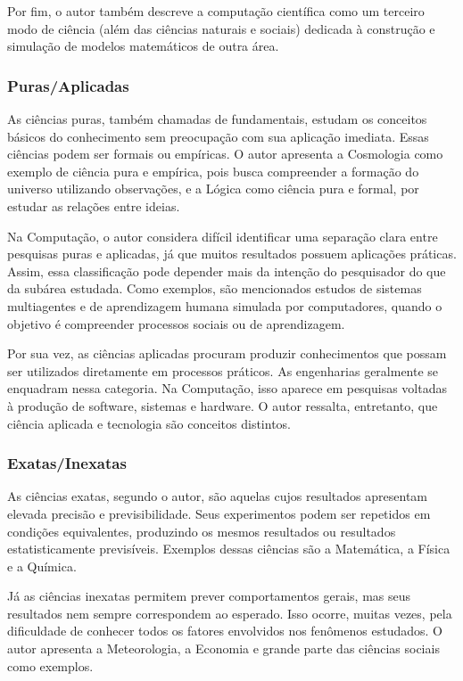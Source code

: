 \documentclass[12pt,a4paper]{article}
\begin{document}
Por fim, o autor também descreve a computação científica como um terceiro modo de ciência (além das ciências naturais e sociais) dedicada à construção e simulação de modelos matemáticos de outra área. 

\subsubsection{Puras/Aplicadas}

As ciências puras, também chamadas de fundamentais, estudam os conceitos básicos do conhecimento sem preocupação com sua aplicação imediata. Essas ciências podem ser formais ou empíricas. O autor apresenta a Cosmologia como exemplo de ciência pura e empírica, pois busca compreender a formação do universo utilizando observações, e a Lógica como ciência pura e formal, por estudar as relações entre ideias.

Na Computação, o autor considera difícil identificar uma separação clara entre pesquisas puras e aplicadas, já que muitos resultados possuem aplicações práticas. Assim, essa classificação pode depender mais da intenção do pesquisador do que da subárea estudada. Como exemplos, são mencionados estudos de sistemas multiagentes e de aprendizagem humana simulada por computadores, quando o objetivo é compreender processos sociais ou de aprendizagem.

Por sua vez, as ciências aplicadas procuram produzir conhecimentos que possam ser utilizados diretamente em processos práticos. As engenharias geralmente se enquadram nessa categoria. Na Computação, isso aparece em pesquisas voltadas à produção de software, sistemas e hardware. O autor ressalta, entretanto, que ciência aplicada e tecnologia são conceitos distintos.

\subsubsection{Exatas/Inexatas}

As ciências exatas, segundo o autor, são aquelas cujos resultados apresentam elevada precisão e previsibilidade. Seus experimentos podem ser repetidos em condições equivalentes, produzindo os mesmos resultados ou resultados estatisticamente previsíveis. Exemplos dessas ciências são a Matemática, a Física e a Química.

Já as ciências inexatas permitem prever comportamentos gerais, mas seus resultados nem sempre correspondem ao esperado. Isso ocorre, muitas vezes, pela dificuldade de conhecer todos os fatores envolvidos nos fenômenos estudados. O autor apresenta a Meteorologia, a Economia e grande parte das ciências sociais como exemplos.
\end{document}

